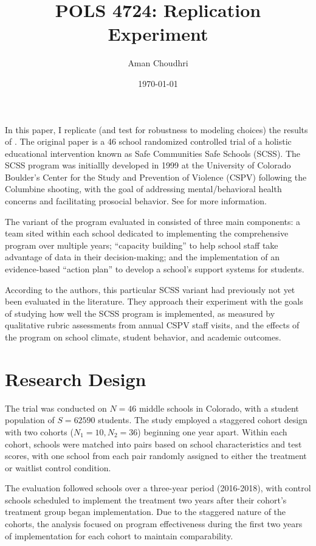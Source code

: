\documentclass[11pt]{article}
\title{POLS 4724: Replication Experiment}
\author{Aman Choudhri}
\date{\today}
\begin{document}
\maketitle

In this paper, I replicate (and test for robustness to modeling choices)
the results of \cite{dymnickiAssessingImplementationEffects2021}. The original
paper is a 46 school randomized controlled trial of a holistic educational
intervention known as Safe Communities Safe Schools (SCSS). The SCSS program
was initiallly developed in 1999 at the University of Colorado Boulder's Center
for the Study and Prevention of Violence (CSPV) following the Columbine
shooting, with the goal of addressing mental/behavioral health concerns and
facilitating prosocial behavior. See \cite{SafeCommunitiesSafe} for more
information.

The variant of the program evaluated in
\cite{dymnickiAssessingImplementationEffects2021} consisted of three main components:
a team sited within each school dedicated to implementing the comprehensive program
over multiple years; ``capacity building'' to help school staff take advantage of data
in their decision-making; and the implementation of an evidence-based ``action plan''
to develop a school's support systems for students.

According to the authors,
this particular SCSS variant had previously not yet been evaluated in the literature.
They approach their experiment with the goals of studying how well the SCSS program is implemented,
as measured by qualitative rubric assessments from annual CSPV staff visits, and the effects
of the program on school climate, student behavior, and academic outcomes.

\section{Research Design}

The trial was conducted on $N = 46$ middle schools in Colorado, with a student
population of $S = 62590$ students. The study employed a staggered cohort
design with two cohorts ($N_{1} = 10, N_{2} = 36$) beginning one year apart.
Within each cohort, schools were matched into pairs based on school
characteristics and test scores, with one school from each pair randomly
assigned to either the treatment or waitlist control condition.

The evaluation followed schools over a three-year period (2016-2018),
with control schools scheduled to implement the treatment two years after their
cohort's treatment group began implementation. Due to the staggered nature of
the cohorts, the analysis focused on program effectiveness during the first two
years of implementation for each cohort to maintain comparability.
\end{document}
